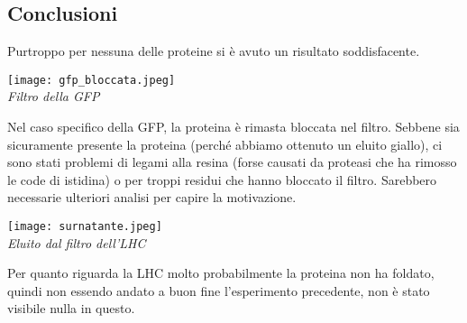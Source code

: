 \documentclass{extarticle}
\begin{document}
\subsection*{Conclusioni}
Purtroppo per nessuna delle proteine si è avuto un risultato soddisfacente.\\
\begin{center}
    \texttt{[image: gfp\_bloccata.jpeg]}\\
    \emph{Filtro della GFP}
\end{center}
Nel caso specifico della GFP, la proteina è rimasta bloccata nel filtro. Sebbene sia sicuramente presente la proteina (perché abbiamo ottenuto un eluito giallo), ci sono stati problemi di legami alla resina (forse causati da proteasi che ha rimosso le code di istidina) o per troppi residui che hanno bloccato il filtro. Sarebbero necessarie ulteriori analisi per capire la motivazione.
\begin{center}
    \texttt{[image: surnatante.jpeg]}\\
    \emph{Eluito dal filtro dell'LHC}
\end{center}
Per quanto riguarda la LHC molto probabilmente la proteina non ha foldato, quindi non essendo andato a buon fine l'esperimento precedente, non è stato visibile nulla in questo.
\end{document}
